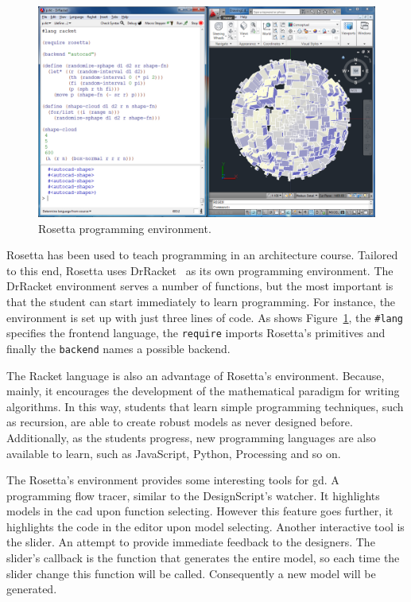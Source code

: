 \begin{figure}[!htbp]
\vspace{-5pt}
  \centering
  \includegraphics[width=1.0\textwidth]{img/rosetta1}
  \vspace{-20pt}
    \caption{Rosetta programming environment.}  
  \label{fig:rosetta}
  \vspace{-10pt}
\end{figure} 

Rosetta has been used to teach programming in an architecture course. Tailored to this end, Rosetta uses DrRacket~\cite{findler2002drscheme} as its own programming environment. The DrRacket environment serves a number of functions, but the most important is that the student can start immediately to learn programming. For instance, the environment is set up with just three lines of code. As shows Figure~\ref{fig:rosetta}, the \texttt{\#lang} specifies the frontend language, the \texttt{require} imports Rosetta's primitives and finally the \texttt{backend} names a possible backend.

The Racket language is also an advantage of Rosetta's environment. Because, mainly, it encourages the development of the mathematical paradigm for writing algorithms. In this way, students that learn simple programming techniques, such as recursion, are able to create robust models as never designed before. Additionally, as the students progress, new programming languages are also available to learn, such as JavaScript, Python, Processing and so on.

The Rosetta's environment provides some interesting tools for \ac{gd}. A programming flow tracer, similar to the DesignScript's watcher. It highlights models in the \ac{cad} upon function selecting. However this feature goes further, it highlights the code in the editor upon model selecting. Another interactive tool is the slider. An attempt to provide immediate feedback to the designers. The slider's callback is the function that generates the entire model, so each time the slider change this function will be called. Consequently a new model will be generated.

